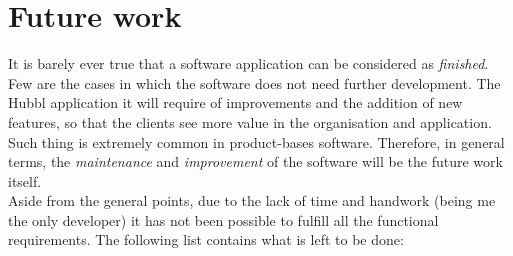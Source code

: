 \documentclass[a4paper, 12pt, oneside]{book}
\begin{document}
\chapter{Future work}
\label{future-work}
It is barely ever true that a software application can be considered as \emph{finished}. Few are the cases in which the software does not need further development. The Hubbl application it will require of improvements and the addition of new features, so that the clients see more value in the organisation and application. Such thing is extremely common in product-bases software. Therefore, in general terms, the \emph{maintenance} and \emph{improvement} of the software will be the future work itself.
\\[8pt]
Aside from the general points, due to the lack of time and handwork (being me the only developer) it has not been possible to fulfill all the functional requirements. The following list contains what is left to be done:
\end{document}
